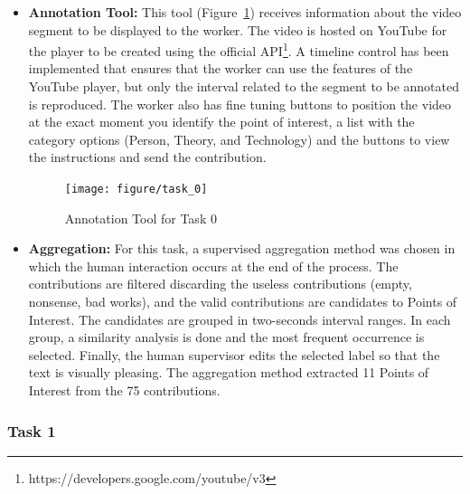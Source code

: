 \begin{itemize}
\item \textbf{Annotation Tool:} This tool (Figure~\ref{task_0}) receives information about the video segment to be displayed to the worker. The video is hosted on YouTube for the player to be created using the official API\footnote{https://developers.google.com/youtube/v3}. A timeline control has been implemented that ensures that the worker can use the features of the YouTube player, but only the interval related to the segment to be annotated is reproduced. The worker also has fine tuning buttons to position the video at the exact moment you identify the point of interest, a list with the category options (Person, Theory, and Technology) and the buttons to view the instructions and send the contribution.
\begin{figure}[h!]
	\centerline{\texttt{[image: figure/task\_0]}}
	\caption{Annotation Tool for Task 0}
	\label{task_0}
\end{figure}

\item \textbf{Aggregation:} For this task, a supervised aggregation method was chosen in which the human interaction occurs at the end of the process. The contributions are filtered discarding the useless contributions (empty, nonsense, bad works), and the valid contributions are candidates to Points of Interest. The candidates are grouped in two-seconds interval ranges. In each group, a similarity analysis is done and the most frequent occurrence is selected. Finally, the human supervisor edits the selected label so that the text is visually pleasing. The aggregation method extracted 11 Points of Interest from the 75 contributions.

\end{itemize}



\subsubsection{Task 1}




